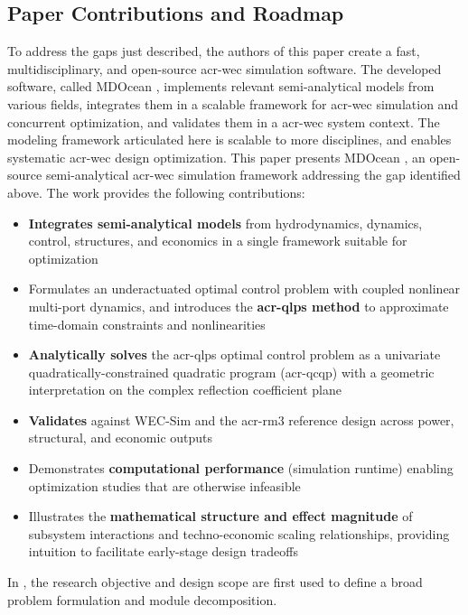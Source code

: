 \subsection{Paper Contributions and Roadmap}
\ifdefined\DISSERTATION
    To address the gaps just described, the authors of this paper create a fast, multidisciplinary, and open-source \gls{acr-wec} simulation software.
    The developed software, called MDOcean \citep{mccabe_mdocean_2024}, implements relevant semi-analytical models from various fields, integrates them in a scalable framework for \gls{acr-wec} simulation and concurrent optimization, and validates them in a \gls{acr-wec} system context.
    The modeling framework articulated here is scalable to more disciplines, and enables systematic \gls{acr-wec} design optimization.
\else
    This paper presents MDOcean \citep{mccabe_mdocean_2024}, an open-source semi-analytical \gls{acr-wec} simulation framework addressing the gap identified above.
    The work provides the following contributions:
    \begin{itemize}[leftmargin=*]
        \item \textbf{Integrates semi-analytical models} from hydrodynamics, dynamics, control, structures, and economics in a single framework suitable for optimization
        \item Formulates an underactuated optimal control problem with coupled nonlinear multi-port dynamics, and introduces the \textbf{\acrfull{acr-qlps} method} to approximate time-domain constraints and nonlinearities
        \item \textbf{Analytically solves} the \gls{acr-qlps} optimal control problem as a univariate quadratically-constrained quadratic program (\gls{acr-qcqp}) with a geometric interpretation on the complex reflection coefficient plane
        \item \textbf{Validates} against WEC-Sim and the \gls{acr-rm3} reference design across power, structural, and economic outputs
        \item Demonstrates \textbf{computational performance} (\resultsAOR[simRuntime] simulation runtime) enabling optimization studies that are otherwise infeasible
        \item Illustrates the \textbf{mathematical structure and effect magnitude} of subsystem interactions and techno-economic scaling relationships, providing intuition to facilitate early-stage design tradeoffs
    \end{itemize}
\fi
\ifdefined\DISSERTATION
    In , the research objective and design scope are first used to define a broad problem formulation and module decomposition.
